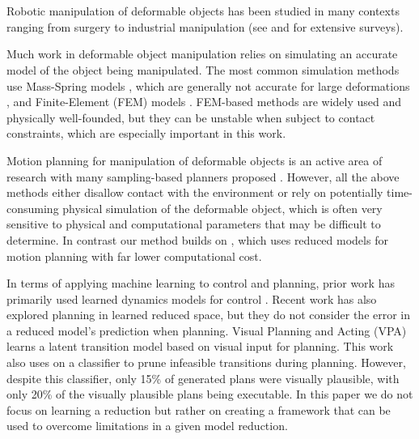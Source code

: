\section{}

Robotic manipulation of deformable objects has been studied in many contexts ranging from surgery to industrial manipulation (see \cite{Khalil2010} and \cite{Sanchez2018deformablesurvey} for extensive surveys).

Much work in deformable object manipulation relies on simulating an accurate model of the object being manipulated. %
The most common simulation methods use Mass-Spring models \cite{Gibson1997, Essahbi2012}, which are generally not accurate for large deformations \cite{Maris2010}, and Finite-Element (FEM) models \cite{Muller2002,Irving2004,Kaufmann2008}. FEM-based methods are widely used and physically well-founded, but they can be unstable when subject to contact constraints, which are especially important in this work. %

Motion planning for manipulation of deformable objects is an active area of research \cite{Jimenez2012} with many sampling-based planners proposed \cite{BurchanBayazit2002,Gayle2005,Moll2006,Saha2008,Roussel2015}. 
However, all the above methods either disallow contact with the environment or rely on potentially time-consuming physical simulation of the deformable object, which is often very sensitive to physical and computational parameters that may be difficult to determine. In contrast our method builds on \cite{McConachie2020}, which uses reduced models for motion planning with far lower computational cost.



In terms of applying machine learning to control and planning, prior work has primarily used learned dynamics models for control \cite{Jia2018,Finn2017,Banijamali2017,Zhang2019, Sutanto2019}. Recent work \cite{ichter2019} has also explored planning in learned reduced space, but they do not consider the error in a reduced model's prediction when planning. Visual Planning and Acting (VPA)~\cite{vpa2019rss} learns a latent transition model based on visual input for planning. This work also uses on a classifier to prune infeasible transitions during planning. However, despite this classifier, only 15\% of generated plans were visually plausible, with only 20\% of the visually plausible plans being executable. In this paper we do not focus on learning a reduction but rather on creating a framework that can be used to overcome limitations in a given model reduction. 
